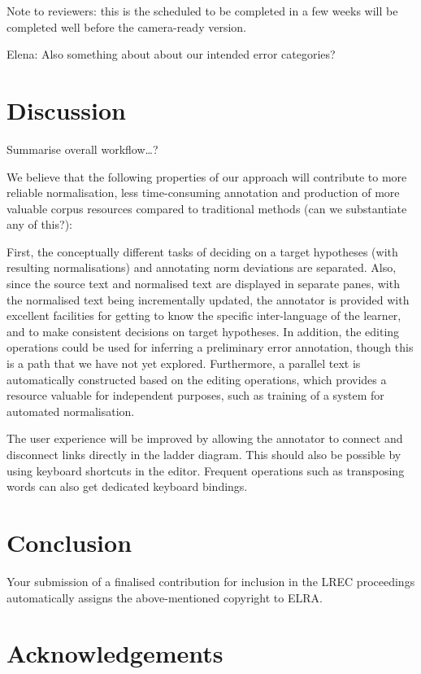 \documentclass[10pt, a4paper]{article}
\begin{document}
Note to reviewers: this is the scheduled to be completed in a few weeks
will be completed well before the camera-ready version.
%

Elena: Also something about about our intended error categories?

\section{Discussion}

Summarise overall workflow\ldots ?

We believe that the following properties of our approach will contribute to more reliable normalisation, less time-consuming annotation and production of more valuable corpus resources compared to traditional methods (can we substantiate any of this?):

First, the conceptually different tasks of deciding on a target hypotheses (with resulting normalisations) and annotating norm deviations are separated. Also, since the source text and normalised text are displayed in separate panes, with the normalised text being incrementally updated, the annotator is provided with excellent facilities for getting to know the specific inter-language of the learner, and to make consistent decisions on target hypotheses. In addition, the editing operations could be used for inferring a preliminary error annotation, though this is a path that we have not yet explored. Furthermore, a parallel text is automatically constructed based on the editing operations, which provides a resource valuable for independent purposes, such as training of a system for automated normalisation.

The user experience will be improved by allowing the annotator to connect
and disconnect links directly in the ladder diagram. This should also be
possible by using keyboard shortcuts in the editor.  Frequent operations
such as transposing words can also get dedicated keyboard bindings.

\section{Conclusion}

Your submission of a finalised contribution for inclusion in the LREC
proceedings automatically assigns the above-mentioned copyright to ELRA.

\section{Acknowledgements}
\end{document}
